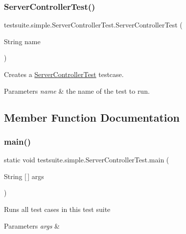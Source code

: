 \subsubsection{\texorpdfstring{Server\+Controller\+Test()}{ServerControllerTest()}}
{\footnotesize\ttfamily testsuite.\+simple.\+Server\+Controller\+Test.\+Server\+Controller\+Test (\begin{DoxyParamCaption}\item[{String}]{name }\end{DoxyParamCaption})}

Creates a \mbox{\hyperlink{classtestsuite_1_1simple_1_1_server_controller_test}{Server\+Controller\+Test}} testcase.


\begin{DoxyParams}{Parameters}
{\em name} & the name of the test to run. \\
\hline
\end{DoxyParams}


\subsection{Member Function Documentation}
\mbox{\label{classtestsuite_1_1simple_1_1_server_controller_test_a8aeb6ae4588ab63220794d7ead41ce35}} 
\subsubsection{\texorpdfstring{main()}{main()}}
{\footnotesize\ttfamily static void testsuite.\+simple.\+Server\+Controller\+Test.\+main (\begin{DoxyParamCaption}\item[{String \mbox{[}$\,$\mbox{]}}]{args }\end{DoxyParamCaption})\hspace{0.3cm}{\ttfamily [static]}}

Runs all test cases in this test suite


\begin{DoxyParams}{Parameters}
{\em args} & \\
\hline
\end{DoxyParams}
\mbox{\label{classtestsuite_1_1simple_1_1_server_controller_test_a8a596dbd3bd3be8d4e90da85076c393e}} 
